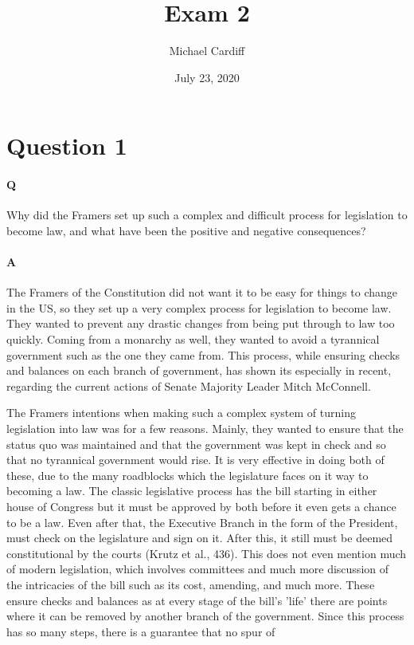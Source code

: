 \documentclass[12pt]{article}
\title{\vspace{-5em} Exam 2}
\author{Michael Cardiff}
\date{July 23, 2020}
\begin{document}
\maketitle
\section*{Question 1}
\paragraph{Q}
Why did the Framers set up such a complex and difficult process for
legislation to become law, and what have been the positive and
negative consequences?
\paragraph{A}
The Framers of the Constitution did not want it to be easy for things
to change in the US, so they set up a very complex process for
legislation to become law. They wanted to prevent any drastic changes
from being put through to law too quickly. Coming from a monarchy as
well, they wanted to avoid a tyrannical government such as the one
they came from. This process, while ensuring checks and balances on
each branch of government, has shown its especially in recent,
regarding the current actions of Senate Majority Leader Mitch
McConnell.
\par
The Framers intentions when making such a complex system of turning
legislation into law was for a few reasons. Mainly, they wanted to
ensure that the status quo was maintained and that the government was
kept in check and so that no tyrannical government would rise. It is
very effective in doing both of these, due to the many roadblocks
which the legislature faces on it way to becoming a law. The classic
legislative process has the bill starting in either house of Congress
but it must be approved by both before it even gets a chance to be a
law. Even after that, the Executive Branch in the form of the
President, must check on the legislature and sign on it. After this,
it still must be deemed constitutional by the courts (Krutz et al.,
436). This does not even mention much of modern legislation, which
involves committees and much more discussion of the intricacies of the
bill such as its cost, amending, and much more. These ensure checks
and balances as at every stage of the bill's 'life' there are points
where it can be removed by another branch of the government. Since
this process has so many steps, there is a guarantee that no spur of
\end{document}
